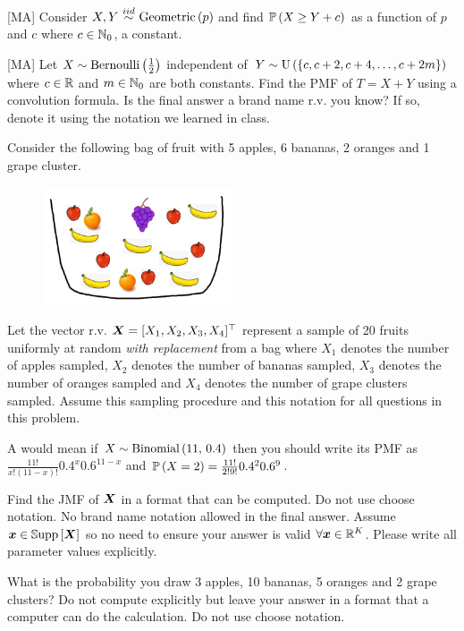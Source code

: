 \documentclass[12pt]{article}
\begin{document}
 [MA] Consider $X, Y \iid \geometric{p}$ and find $\mathbb{P}\left(X \geq Y + c\right)$ as a function of $p$ and $c$ where $c \in \mathbb{N}_0$, a constant.  

 [MA] Let $X \sim \mathrm{Bernoulli}\left(\frac{1}{2}\right)$ independent of $Y \sim \text{U}\left(\left\{c, c + 2, c + 4, \ldots, c + 2m\right\}\right)$ where $c \in \mathbb{R}$ and $m \in \mathbb{N}_0$ are both constants. Find the PMF of $T = X + Y$ using a convolution formula. Is the final answer a brand name r.v. you know? If so, denote it using the notation we learned in class. 

\eenum


\problem Consider the following bag of fruit with 5 apples, 6 bananas, 2 oranges and 1 grape cluster.

\begin{figure}[h]
\centering
\includegraphics[width=2.2in]{fruit_bag.png}
\end{figure}

\noindent Let the vector r.v. $\boldsymbol{X} = [X_1, X_2, X_3, X_4]^\top$ represent a sample of 20 fruits uniformly at random \textit{with replacement} from a bag where $X_1$ denotes the number of apples sampled, $X_2$ denotes the number of bananas sampled, $X_3$ denotes the number of oranges sampled and $X_4$ denotes the number of grape clusters sampled. Assume this sampling procedure and this notation for all questions in this problem. 

A  would mean if $X \sim \mathrm{Binomial}\left(11,\,0.4\right)$ then you should write its PMF as $\frac{11!}{x!(11-x)!}0.4^x 0.6^{11-x}$ and $\mathbb{P}\left(X = 2\right) = \frac{11!}{2!9!}0.4^2 0.6^{9}$.


\benum

 Find the JMF of $\boldsymbol{X}$ in a format that can be computed. Do not use choose notation. No brand name notation allowed in the final answer. Assume $\boldsymbol{x} \in \mathbb{S}\text{upp}\left[\boldsymbol{X}\right]$ so no need to ensure your answer is valid $\forall \boldsymbol{x} \in \mathbb{R}^K$. Please write all parameter values explicitly. 


 What is the probability you draw 3 apples, 10 bananas, 5 oranges and 2 grape clusters? Do not compute explicitly but leave your answer in a format that a computer can do the calculation. Do not use choose notation. 
\end{document}
